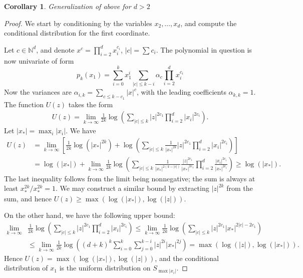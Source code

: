\documentclass[12pt]{article}
\def\N{\mathbb{N}}
\newtheorem{corollary}{Corollary}[section]
\begin{document}
\begin{corollary}
    Generalization of above for $d > 2$
\end{corollary}
\begin{proof}
    We start by conditioning by the variables $x_2,\dots,x_d$, and compute the conditional distribution for the first coordinate. 
    
    Let $c \in \N^d$, and denote $x^c = \prod_{i=2}^d x_i^{c_i}$, $|c| = \sum c_i$. 
    The polynomial in question is now univariate of form 
    \[ p_k(x_1) = \sum_{i=0}^k  x_1^i \sum_{|c| \leq k-i} \alpha_{c} \prod_{i=2}^d x_i^{c_i} \]
    Now the variances are $\alpha_{i,k} = \sum_{c \leq k-c_1} |x|^c$, with the leading coefficients $\alpha_{k,k} = 1$. The function $U(z)$ takes the form
    \begin{align*}
        U(z) = \lim_{k\to\infty} \frac{1}{2k} \log \left( \sum_{|c|\leq k} |z|^{2c_1} \prod_{i=2}^d |x_i|^{2c_i} \right).
    \end{align*}
    Let $|x_*| = \max_{i} |x_i|$. We have
    \begin{align*}
        U(z) &= \lim_{k\to \infty} \left[ \frac{1}{2k}\log(|x_*|^{2k}) + \log \left( \sum_{|c|\leq k} \frac{1}{|x_*|^{2k}} |z|^{2c_1}\prod_{i=2}^d |x_i|^{2c_i} \right) \right] \\
        &=  \log(|x_*|) + \lim_{k\to \infty}\frac{1}{2k} \log \left( \sum_{|c|\leq k} \frac{1}{|x_*|^{2(k-|c|)}} \frac{|z|^{2c_1}}{|x_*|^{2c_1}} \prod_{i=2}^d \frac{|x_i|^{2c_i}}{|x_*|^{2c_i}} \right) \geq \log(|x_*|) .
    \end{align*}
    The last inequality follows from the limit being nonnegative; the sum is always at least $x_*^{2k}/x_*^{2k} = 1$. We may construct a similar bound by extracting $|z|^{2k}$ from the sum, and hence $U(z) \geq \max(\log(|x_*|),\log(|z|))$.


    On the other hand, we have the following upper bound:
    \begin{align*} \lim_{k\to \infty} &\frac{1}{2k} \log \left(\sum_{|c|\leq k} |z|^{2c_1} \prod_{i=2}^d |x_i|^{2c_i} \right) \leq \lim_{k\to \infty} \frac{1}{2k} \log \left( \sum_{|c|\leq k} |z|^{2c_1}|x_*|^{2|c|-2c_1} \right) \\
    &\leq \lim_{k\to \infty} \frac{1}{2k} \log \left( (d+k)^k \sum_{i=0}^k \sum_{j=0}^{k-i} |z|^{2i} |x_*|^{2j} \right) = \max( \log (|z|), \log(|x_*|)).
    \end{align*}
    Hence $U(z) = \max(\log(|x_*|), \log(|z|))$, and the conditional distribution of $x_1$ is the uniform distribution on $S_{\max |x_i|}$.


\end{proof}
\end{document}
